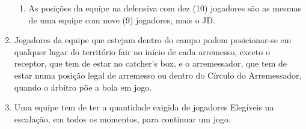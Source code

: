 \begin{enumerate}[label=(\alph*)]
\begin{enumerate}[label=\roman*.]




		\item  As posições da equipe na defensiva com dez (10) jogadores são as mesmas
		de uma equipe com nove (9) jogadores, mais o JD.
	\end{enumerate}
	\item  Jogadores da equipe que estejam dentro do campo podem posicionar-se em
	qualquer lugar do território \gls{fair} no início de cada arremesso, exceto o receptor,
	que tem de estar no \gls{catcher's box}, e o arremessador, que tem de estar numa
	posição legal de arremesso ou dentro do Círculo do Arremessador, quando o árbitro põe a bola em jogo.
	\item  Uma equipe tem de ter a quantidade exigida de jogadores Elegíveis na
	escalação, em todos os momentos, para continuar um jogo.
\end{enumerate}
